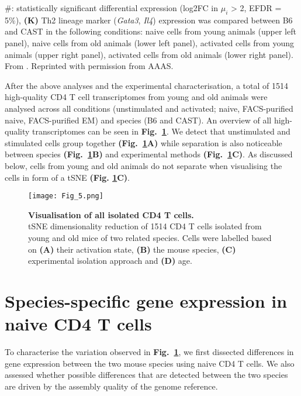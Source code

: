 {\#: statistically significant differential expression (log2FC in $\mu_i$ > 2, EFDR = 5\%), 
\textbf{(K)} Th2 lineage marker (\textit{Gata3}, \textit{Il4}) expression was compared between B6 and CAST in the following conditions: naive cells from young animals (upper left panel), naive cells from old animals (lower left panel), activated cells from young animals (upper right panel), activated cells from old animals (lower right panel). 
From \citep{Martinez-jimenez2017}. 
Reprinted with permission from AAAS.\\}
\captionsetup[figure]{list=yes}

After the above analyses and the experimental characterisation, a total of 1514 high-quality CD4\plus{} T cell transcriptomes from young and old animals were analysed across all conditions (unstimulated and activated; naive, FACS-purified naive, FACS-purified EM) and species (B6 and CAST). 
An overview of all high-quality transcriptomes can be seen in \textbf{Fig.~\ref{fig1:all_cells}}. We detect that unstimulated and stimulated cells group together \textbf{(Fig.~\ref{fig1:all_cells}A)} while separation is also noticeable between species \textbf{(Fig.~\ref{fig1:all_cells}B)} and experimental methods \textbf{(Fig.~\ref{fig1:all_cells}C)}. 
As discussed below, cells from young and old animals do not separate when visualising the cells in form of a tSNE  \textbf{(Fig. \ref{fig1:all_cells}C)}. 

\newpage

\begin{figure}[!hb]
\centering
\texttt{[image: Fig\_5.png]}
\caption[Visualisation of all isolated CD4\plus{} T cells]{\textbf{Visualisation of all isolated CD4\plus{} T cells.}\\
tSNE dimensionality reduction of 1514 CD4\plus{} T cells isolated from young and old mice of two related species. Cells were labelled based on 
\textbf{(A)} their activation state, \textbf{(B)} the mouse species, 
\textbf{(C)} experimental isolation approach and \textbf{(D)} age.}
\label{fig1:all_cells}
\end{figure}

\newpage

\section{Species-specific gene expression in naive CD4\plus{} T cells}

To characterise the variation observed in \textbf{Fig.~\ref{fig1:all_cells}}, we first dissected differences in gene expression between the two mouse species using naive CD4\plus{} T cells. 
We also assessed whether possible differences that are detected between the two species are driven by the assembly quality of the genome reference.


